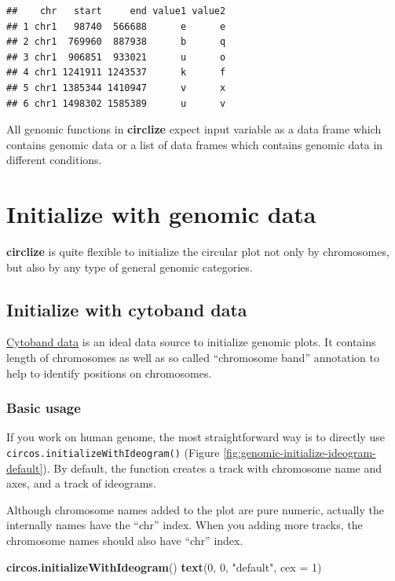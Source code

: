 \documentclass[]{book}
\newenvironment{Shaded}{\begin{snugshade}}{\end{snugshade}}
\newcommand{\KeywordTok}[1]{\textcolor[rgb]{0.13,0.29,0.53}{\textbf{#1}}}
\newcommand{\DataTypeTok}[1]{\textcolor[rgb]{0.13,0.29,0.53}{#1}}
\newcommand{\DecValTok}[1]{\textcolor[rgb]{0.00,0.00,0.81}{#1}}
\newcommand{\StringTok}[1]{\textcolor[rgb]{0.31,0.60,0.02}{#1}}
\newcommand{\NormalTok}[1]{#1}
\theoremstyle{definition}
\theoremstyle{definition}
\theoremstyle{remark}
\begin{document}
\begin{verbatim}
##    chr   start     end value1 value2
## 1 chr1   98740  566688      e      e
## 2 chr1  769960  887938      b      q
## 3 chr1  906851  933021      u      o
## 4 chr1 1241911 1243537      k      f
## 5 chr1 1385344 1410947      v      x
## 6 chr1 1498302 1585389      u      v
\end{verbatim}

All genomic functions in \textbf{circlize} expect input variable as a
data frame which contains genomic data or a list of data frames which
contains genomic data in different conditions.

\chapter{Initialize with genomic data}\label{initialize-genomic-plot}

\textbf{circlize} is quite flexible to initialize the circular plot not
only by chromosomes, but also by any type of general genomic categories.

\section{Initialize with cytoband data}\label{initialize-cytoband}

\href{https://genome.ucsc.edu/cgi-bin/hgTables?hgta_table=cytoBand\&hgta_doSchema=describe\%20table\%20schema}{Cytoband
data} is an ideal data source to initialize genomic plots. It contains
length of chromosomes as well as so called ``chromosome band''
annotation to help to identify positions on chromosomes.

\subsection{Basic usage}\label{basic-usage}

If you work on human genome, the most straightforward way is to directly
use \texttt{circos.initializeWithIdeogram()} (Figure
\ref{fig:genomic-initialize-ideogram-default}). By default, the function
creates a track with chromosome name and axes, and a track of ideograms.

Although chromosome names added to the plot are pure numeric, actually
the internally names have the ``chr'' index. When you adding more
tracks, the chromosome names should also have ``chr'' index.

\begin{Shaded}
\begin{Highlighting}[]
\KeywordTok{circos.initializeWithIdeogram}\NormalTok{()}
\KeywordTok{text}\NormalTok{(}\DecValTok{0}\NormalTok{, }\DecValTok{0}\NormalTok{, }\StringTok{"default"}\NormalTok{, }\DataTypeTok{cex =} \DecValTok{1}\NormalTok{)}
\end{Highlighting}
\end{Shaded}
\end{document}
